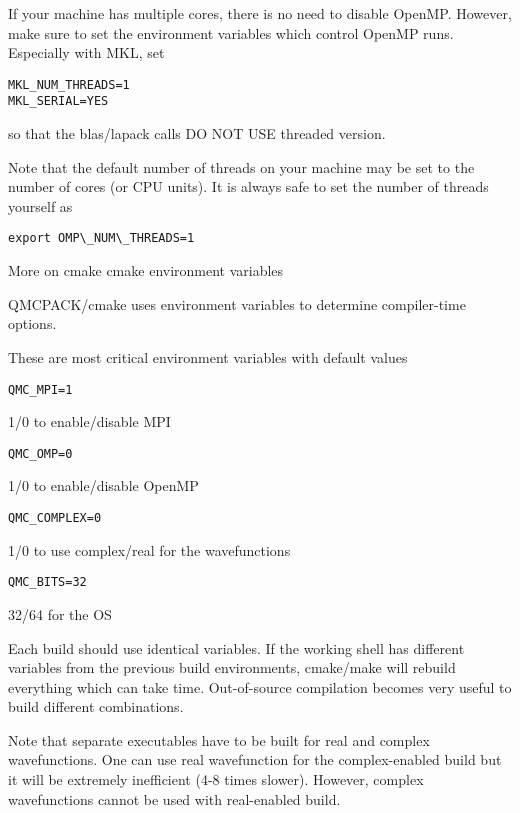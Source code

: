 If your machine has multiple cores, there is no need to disable OpenMP.  However, make sure to set the environment variables which control OpenMP runs.  Especially with MKL, set
\begin{verbatim}
MKL_NUM_THREADS=1
MKL_SERIAL=YES
\end{verbatim}
so that the blas/lapack calls DO NOT USE threaded version.

Note that the default number of threads on your machine may be set to the number of cores (or CPU units). It is always safe to set the number of threads yourself as
\begin{verbatim}
export OMP\_NUM\_THREADS=1
\end{verbatim}

More on cmake
cmake environment variables

QMCPACK/cmake uses environment variables to determine compiler-time options.

These are most critical environment variables with default values
\begin{verbatim}
QMC_MPI=1
\end{verbatim}

1/0 to enable/disable MPI
\begin{verbatim}
QMC_OMP=0
\end{verbatim}

1/0 to enable/disable OpenMP
\begin{verbatim}
QMC_COMPLEX=0
\end{verbatim}

1/0 to use complex/real for the wavefunctions
\begin{verbatim}
QMC_BITS=32
\end{verbatim}

32/64 for the OS

Each build should use identical variables. If the working shell has different variables from the previous build environments, cmake/make will rebuild everything which can take time. Out-of-source compilation becomes very useful to build different combinations.

Note that separate executables have to be built for real and complex wavefunctions. One can use real wavefunction for the complex-enabled build but it will be extremely inefficient (4-8 times slower). However, complex wavefunctions cannot be used with real-enabled build. 

